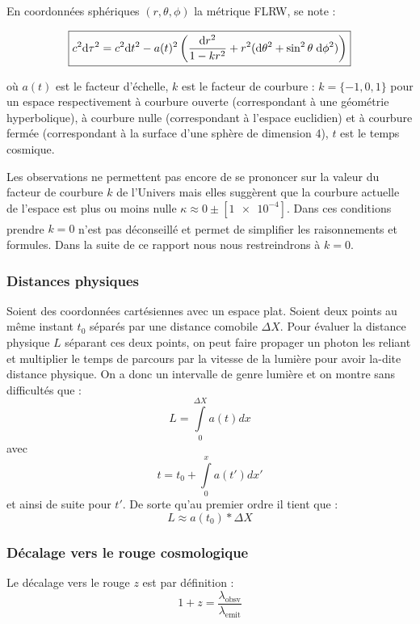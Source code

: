\documentclass[10pt, a4paper]{report}
\numberwithin{equation}{subsection}
\begin{document}
En coordonnées sphériques $(r, \theta, \phi)$ la métrique FLRW, se note :

\begin{equation}
\boxed{ c^2 {\rm d}\tau^2 = c^2 {\rm d}t^2 - a(t)^2 \left (\frac{{\rm d}r^2}{1 - k r^2} + r^2 ({\rm d}\theta^2 + \sin^2 \theta \; {\rm d} \phi^2) \right )}
\end{equation}

où $a(t)$ est le facteur d'échelle, $k$ est le facteur de courbure : $k = \{-1,0,1\}$ pour un espace respectivement à courbure ouverte (correspondant à une géométrie hyperbolique), à courbure nulle (correspondant à l'espace euclidien) et à courbure fermée (correspondant à la surface d'une sphère de dimension 4), $t$ est le temps cosmique.

Les observations ne permettent pas encore de se prononcer sur la valeur du facteur de courbure $k$ de l'Univers mais elles suggèrent que la courbure actuelle de l'espace est plus ou moins nulle $ \kappa \approx 0 \pm [\num{1e-4}]$. Dans ces conditions prendre $k=0$ n'est pas déconseillé\textsuperscript{\cite{Weinberg}} et permet de simplifier les raisonnements et formules. Dans la suite de ce rapport nous nous restreindrons à $k=0$. 
\subsubsection{Distances physiques}
Soient des coordonnées cartésiennes avec un espace plat. Soient deux points au même instant $t_0$ séparés par une distance comobile $\Delta X$. Pour évaluer la distance physique $L$ séparant ces deux points, on peut faire propager un photon les reliant et multiplier le temps de parcours par la vitesse de la lumière pour avoir la-dite distance physique. On a donc un intervalle de genre lumière et on montre sans difficultés que :
\begin{equation}
\boxed{ L=\int\limits_0^{\Delta X} a(t)dx}
\end{equation}
avec \begin{equation}
\boxed{ t=t_0 + \int\limits_0^x a(t')dx'}
\end{equation}
et ainsi de suite pour $t'$.
De sorte qu'au premier ordre il tient que :
\begin{equation} \label{eq:foL}
\boxed{ L \approx a(t_0) * \Delta X}
\end{equation}
\subsubsection{Décalage vers le rouge cosmologique}
Le décalage vers le rouge $z$ est par définition : 
\begin{equation}
\boxed{1+z = \frac{\lambda_{\mathrm{obsv}}}{\lambda_{\mathrm{emit}}}}
\end{equation}
\end{document}
